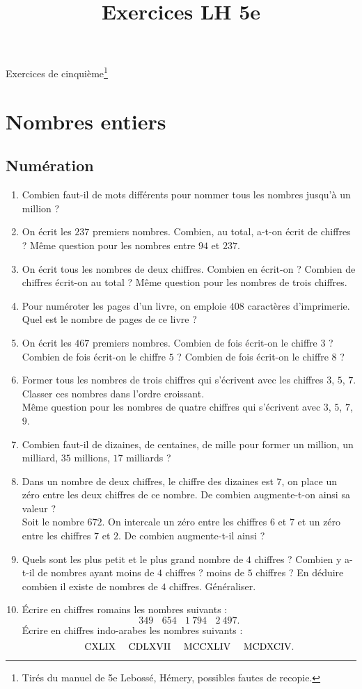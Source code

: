 \documentclass[12 pt]{extarticle}
\title{Exercices LH 5e}
\date{}
\theoremstyle{plain}
\begin{document}
\begin{center}{\Large Exercices de cinquième\footnote{Tirés du manuel de 5e Lebossé, Hémery, possibles fautes de recopie.}}\\
 \end{center}  
 
 \section{Nombres entiers}
 \subsection{Numération}
 
 \begin{enumerate}
 \item Combien faut-il de mots différents pour nommer tous les nombres jusqu'à un million ? 
 \item On écrit les $237$ premiers nombres. Combien, au total, a-t-on écrit de chiffres ? Même question pour les nombres entre $94$ et $237$. 
 \item On écrit tous les nombres de deux chiffres. Combien en écrit-on ? 
 Combien de chiffres écrit-on au total ? Même question pour les nombres de trois chiffres. 
 \item Pour numéroter les pages d'un livre, on emploie $408$ caractères d'imprimerie. Quel est le nombre de pages de ce livre ?
 \item On écrit les $467$ premiers nombres. Combien de fois écrit-on le chiffre $3$ ? Combien de fois écrit-on le chiffre $5$ ? Combien de fois écrit-on le chiffre $8$ ? 
 \item Former tous les nombres de trois chiffres qui s'écrivent avec les chiffres $3$, $5$, $7$. Classer ces nombres dans l'ordre croissant.\\
 Même question pour les nombres de quatre chiffres qui s'écrivent avec $3$, $5$, $7$, $9$. 
 \item Combien faut-il de dizaines, de centaines, de mille pour former un million, un milliard, $35$ millions, $17$ milliards ?
 \item Dans un nombre de deux chiffres, le chiffre des dizaines est $7$, on place un zéro entre les deux chiffres de ce nombre. De combien augmente-t-on ainsi sa valeur ? \\
 Soit le nombre $672$. On intercale un zéro entre les chiffres $6$ et $7$ et un zéro entre les chiffres $7$ et $2$. De combien augmente-t-il ainsi ? 
 \item Quels sont les plus petit et le plus grand nombre de $4$ chiffres ? Combien y a-t-il de nombres ayant moins de $4$ chiffres ? moins de $5$ chiffres ? En déduire combien il existe de nombres de $4$ chiffres. Généraliser. 
 \item Écrire en chiffres romains les nombres suivants : 
 \[ 349 \ \ \ \ 654 \ \ \ \ 1\ 794 \ \ \ \ 2\ 497. \]
 Écrire en chiffres indo-arabes les nombres suivants : 
 \[ \rm CXLIX \ \ \ \ CDLXVII \ \ \ \ MCCXLIV \ \ \ \ MCDXCIV. \]
 

\end{enumerate}
\end{document}

